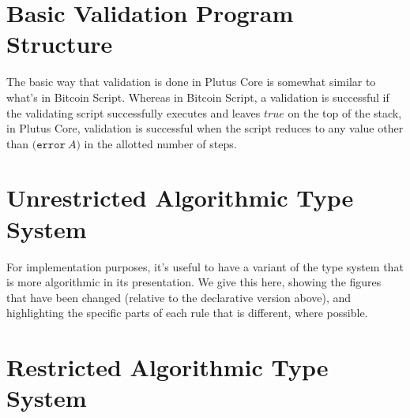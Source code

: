 \documentclass[a4paper]{article}
\newcommand{\keyword}[1]{\texttt{#1}}
\newcommand{\construct}[1]{\texttt{(} #1 \texttt{)}}
\newcommand{\error}[1]{\construct{\keyword{error} ~ #1}}
\begin{document}


\section{Basic Validation Program Structure}

The basic way that validation is done in Plutus Core is somewhat
similar to what's in Bitcoin Script. Whereas in Bitcoin Script, a
validation is successful if the validating script successfully
executes and leaves $\textit{true}$ on the top of the stack, in Plutus
Core, validation is successful when the script reduces to any value
other than \(\error{A}\) in the allotted number of steps.




%

%

%


%



\section{Unrestricted Algorithmic Type System}

For implementation purposes, it's useful to have a variant of the type system that is more algorithmic in its presentation. We give this here, showing the figures that have been changed (relative to the declarative version above), and highlighting the specific parts of each rule that is different, where possible.





\section{Restricted Algorithmic Type System}
\end{document}
